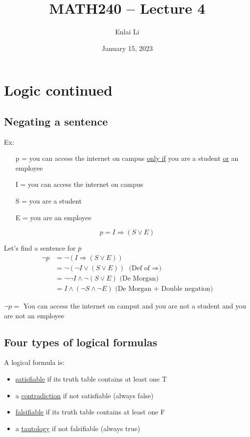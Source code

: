 \documentclass{article}
\author{Enlai Li}
\title{MATH240 -- Lecture 4}
\date{January 15, 2023}
\begin{document}
\maketitle
\section{Logic continued}
\subsection{Negating a sentence}
Ex:
\begin{itemize}
    \item [p =] you can access the internet on campus \underline{only if} you are a student \underline{or} an employee
    \item [I =] you can access the internet on campus
    \item [S =] you are a student
    \item [E =] you are an employee
\end{itemize}
\[
    p = I \Rightarrow (S \lor E)
\]

Let's find a sentence for $\overline{p}$
\begin{align*}
    \lnot p
     & = \lnot (I \Rightarrow (S \lor E))
    \\ & = \lnot (\lnot I \lor (S \lor E)) \text{ (Def of $\Rightarrow $)}
    \\ & = \lnot \lnot I \land \lnot(S \lor E) \text{ (De Morgan)}
    \\ & =  I \land (\lnot S \land \lnot E) \text{ (De Morgan + Double negation)}
\end{align*}

$ \lnot p =$ You can access the internet on camput and you are not a student and you are not an employee

\subsection{Four types of logical formulas}
A logical formula is:
\begin{itemize}
    \item \underline{satisfiable} if its truth table contains at least one T
    \item a \underline{contradiction} if not satisfiable (always false)
    \item \underline{falsifiable} if its truth table contains at least one F
    \item a \underline{tautology} if not falsifiable (always true)
\end{itemize}
\clearpage
\end{document}
